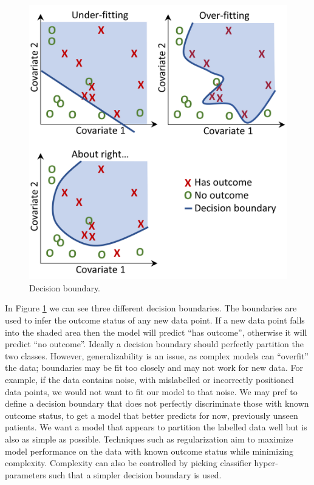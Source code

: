 \documentclass[11pt]{book}
\theoremstyle{definition}
\theoremstyle{definition}
\theoremstyle{definition}
\theoremstyle{remark}
\begin{document}
\begin{figure}

{\centering \includegraphics[width=0.8\linewidth]{images/PatientLevelPrediction/decisionBoundary} 

}

\caption{Decision boundary.}\label{fig:decisionBoundary}
\end{figure}

In Figure \ref{fig:decisionBoundary} we can see three different decision boundaries. The boundaries are used to infer the outcome status of any new data point. If a new data point falls into the shaded area then the model will predict ``has outcome'', otherwise it will predict ``no outcome''. Ideally a decision boundary should perfectly partition the two classes. However, generalizability is an issue, as complex models can ``overfit'' the data; boundaries may be fit too closely and may not work for new data. For example, if the data contains noise, with mislabelled or incorrectly positioned data points, we would not want to fit our model to that noise. We may pref to define a decision boundary that does not perfectly discriminate those with known outcome status, to get a model that better predicts for now, previously unseen patients. We want a model that appears to partition the labelled data well but is also as simple as possible. Techniques such as regularization aim to maximize model performance on the data with known outcome status while minimizing complexity. Complexity can also be controlled by picking classifier hyper-parameters such that a simpler decision boundary is used.
\end{document}
